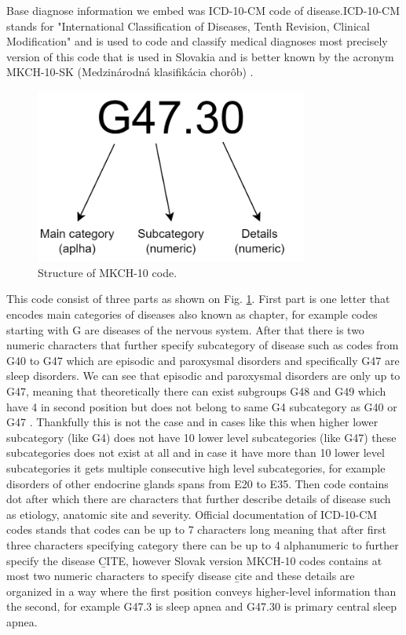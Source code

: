 Base diagnose information we embed was ICD-10-CM code of disease.ICD-10-CM stands for "International Classification of Diseases, Tenth Revision, Clinical Modification" and is used to code and classify medical diagnoses \cite{cdcICD10CM} most precisely version of this code that is used in Slovakia and is better known by the acronym MKCH-10-SK (Medzinárodná klasifikácia chorôb) \cite{ncziMKCH}.\\

\begin{figure}[!h]
	\centering
	
	\includegraphics[width=0.8\textwidth]{images/ICD-10-CM.png}
	
	\caption{Structure of MKCH-10 code.}
	\label{fig:icd-10-cm}
\end{figure}

This code consist of three parts as shown on Fig. \ref{fig:icd-10-cm}. First part is one letter that encodes main categories of diseases also known as chapter, for example codes starting with G are diseases of the nervous system. 
After that there is two numeric characters that further specify subcategory of disease such as codes from G40 to G47 which are episodic and paroxysmal disorders and specifically G47 are sleep disorders. 
We can see that episodic and paroxysmal disorders are only up to G47, meaning that theoretically there can exist subgroups G48 and G49 which have 4 in second position but does not belong to same G4 subcategory as G40 or G47 \label{mkch_subdiv}. Thankfully this is not the case and in cases like this when higher lower subcategory (like G4) does not have 10 lower level subcategories (like G47) these subcategories does not exist at all and in case it have more than 10 lower level subcategories it gets multiple consecutive high level subcategories, for example disorders of other endocrine glands spans from E20 to E35. 
Then code contains dot after which there are characters that further describe details of disease such as etiology, anatomic site and severity. Official documentation of ICD-10-CM codes stands that codes can be up to 7 characters long meaning that after first three characters specifying category there can be up to 4 alphanumeric to further specify the disease \b{CITE}, however Slovak version MKCH-10 codes contains at most two numeric characters to specify disease \b{cite} and these details are organized in a way where the first position conveys higher-level information than the second, for example G47.3 is sleep apnea and G47.30 is primary central sleep apnea.
\\

